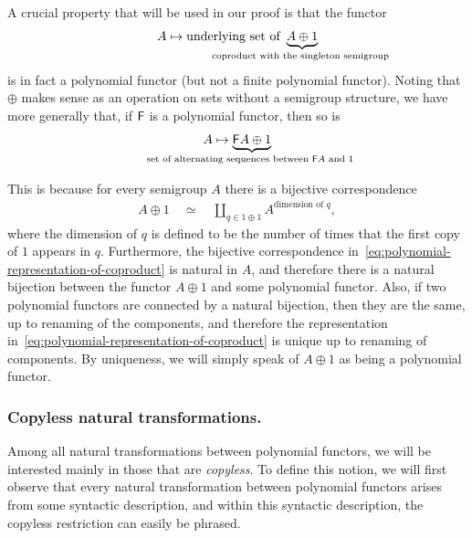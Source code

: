 \begin{myexample}\label{ex:coproduct-as-polynomial-functor}
    A crucial property that will be used in our proof is that the functor
    \begin{align*}
    A \mapsto \text{underlying set of}\ \myunderbrace{A \oplus 1}{\text{coproduct with the singleton semigroup}}
    \end{align*}
    is in fact a polynomial functor (but not a finite polynomial functor). Noting that $\oplus$ makes sense as an operation on sets without a semigroup structure, we have more generally that, if $\mathsf F$ is a polynomial functor, then so is
    \begin{align*}
        A \mapsto \myunderbrace{\functor A \oplus 1}{\text{set of alternating sequences between $\functor A$ and $1$}}
    \end{align*}
    
    This is because for every semigroup $A$ there is a bijective correspondence 
    \begin{align}\label{eq:polynomial-representation-of-coproduct}
    A \oplus 1 \quad \simeq \quad \coprod_{q \in 1 \oplus 1} A^{\text{dimension of $q$}},
    \end{align}
    where the dimension of $q$ is defined to be the number of times that the first copy of $1$ appears in $q$. Furthermore, the bijective correspondence in~\eqref{eq:polynomial-representation-of-coproduct} is natural in $A$, and therefore there is a natural bijection between the functor $A \oplus 1$ and some polynomial functor. Also, if two polynomial functors are connected by a natural bijection, then they are the same, up to renaming of the components, and therefore the representation in~\eqref{eq:polynomial-representation-of-coproduct} is unique up to renaming of components. By uniqueness, we will simply speak of $A \oplus 1$ as being a polynomial functor. 
\end{myexample}




\subsubsection{Copyless natural transformations.}  Among all natural  transformations between polynomial functors, we will be interested mainly in those that are  \emph{copyless}. To define this notion, we will first observe that  every natural transformation between polynomial functors  arises from some syntactic description, and within this syntactic description, the copyless restriction can easily be phrased. 

